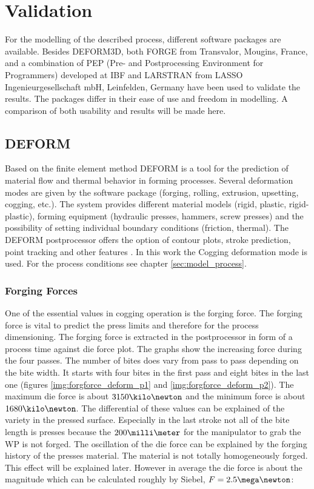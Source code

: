 \section{Validation}

For the modelling of the described process, different software packages are available. Besides DEFORM3D, both FORGE from Transvalor, Mougins, France, and a combination of PEP (Pre- and Postprocessing Environment for Programmers) developed at IBF and LARSTRAN from LASSO Ingenieurgesellschaft mbH, Leinfelden, Germany have been used to validate the results. The packages differ in their ease of use and freedom in modelling. A comparison of both usability and results will be made here.

\subsection{DEFORM}
Based on the finite element method DEFORM is a tool for the prediction of material flow and thermal behavior in forming processes. Several deformation modes are given by the software package (forging, rolling, extrusion, upsetting, cogging, etc.).  The system provides different material models (rigid, plastic, rigid-plastic), forming equipment (hydraulic presses, hammers, screw presses) and the possibility of setting individual boundary conditions (friction, thermal). The DEFORM postprocessor offers the option of contour plots, stroke prediction, point tracking and other features \cite{deform}. In this work the Cogging deformation mode is used. For the process conditions see chapter \ref{sec:model_process}.

\subsubsection{Forging Forces}
One of the essential values in cogging operation is the forging force. The forging force is vital to predict the press limits and therefore for the process dimensioning. The forging force is extracted in the postprocessor in form of a process time against die force plot. The graphs show the increasing force during the four passes. The number of bites does vary from pass to pass depending on the bite width. It starts with four bites in the first pass and eight bites in the last one (figures \ref{img:forgforce_deform_p1} and \ref{img:forgforce_deform_p2}). The maximum die force is about $3150\kilo\newton$ and the minimum force is about $1680\kilo\newton$. The differential of these values can be explained of the variety in the pressed surface. Especially in the last stroke not all of the bite length is presses because the $200\milli\meter$ for the manipulator to grab the WP is not forged. The oscillation of the die force can be explained by the forging history of the presses material. The material is not totally homogeneously forged. This effect will be explained later. However in average the die force is about the magnitude which can be calculated roughly by Siebel, $F=2.5\mega\newton$:


